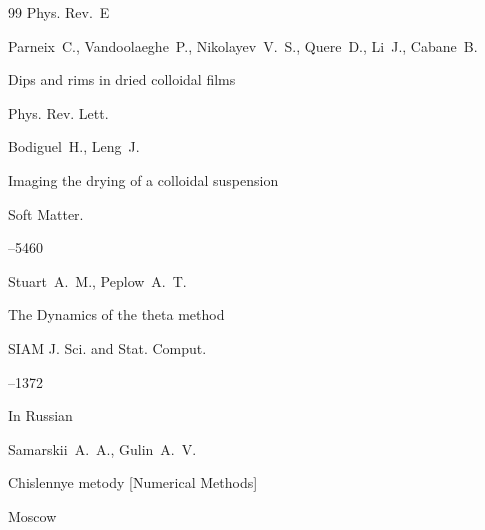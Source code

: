 \begin{thebibliography}{99}
\jour Phys. Rev.~E 








\by Parneix~C., Vandoolaeghe~P., Nikolayev~V.~S., Quere~D., Li~J., Cabane~B.

\paper Dips and rims in dried colloidal films 

\jour Phys. Rev. Lett. 









\by Bodiguel~H., Leng~J.

\paper  Imaging the drying of a colloidal suspension 

\jour Soft Matter. 




--5460





\by Stuart~A.~M., Peplow~A.~T.

\paper  The Dynamics of the theta method 

\jour SIAM J. Sci. and Stat. Comput.




--1372





\lang In Russian

\by Samarskii~A.~A., Gulin~A.~V.

\book  Chislennye metody \rm [Numerical Methods]

\publaddr Moscow


\end{thebibliography}
